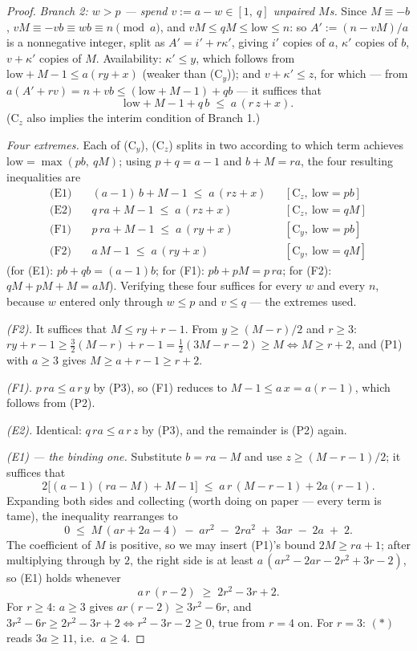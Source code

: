 \documentclass[11pt,reqno]{amsart}
\theoremstyle{plain}
\theoremstyle{definition}
\theoremstyle{remark}
\begin{document}
\begin{proof}
\emph{Branch 2: $w > p$ --- spend $v := a - w \in [1,\ q]$ unpaired $M$s.} Since
$M \equiv -b$, $vM \equiv -vb \equiv wb \equiv n \pmod a$, and $vM \le qM \le
\mathrm{low} \le n$: so $A' := (n - vM)/a$ is a nonnegative integer, split as $A'
= i' + r\kappa'$, giving $i'$ copies of $a$, $\kappa'$ copies of $b$, $v +
\kappa'$ copies of $M$. Availability: $\kappa' \le y$, which follows from
$\mathrm{low} + M - 1 \le a(ry + x)$ (weaker than (C$_y$)); and $v + \kappa' \le
z$, for which --- from $a(A' + rv) = n + vb \le (\mathrm{low} + M - 1) + qb$ ---
it suffices that
\[
  \mathrm{low} + M - 1 + q\,b \;\le\; a\,(r\,z + x) . \tag{C$_z$}
\]
(C$_z$ also implies the interim condition of Branch 1.)

\emph{Four extremes.} Each of (C$_y$), (C$_z$) splits in two according to which
term achieves $\mathrm{low} = \max(pb,\ qM)$; using $p + q = a - 1$ and $b + M =
ra$, the four resulting inequalities are
\begin{align*}
  \text{(E1)}\quad & (a-1)\,b + M - 1 \;\le\; a\,(rz + x)
  && [\text{C}_z,\ \mathrm{low} = pb] \\
  \text{(E2)}\quad & q\,ra + M - 1 \;\le\; a\,(rz + x)
  && [\text{C}_z,\ \mathrm{low} = qM] \\
  \text{(F1)}\quad & p\,ra + M - 1 \;\le\; a\,(ry + x)
  && [\text{C}_y,\ \mathrm{low} = pb] \\
  \text{(F2)}\quad & a\,M - 1 \;\le\; a\,(ry + x)
  && [\text{C}_y,\ \mathrm{low} = qM]
\end{align*}
(for (E1): $pb + qb = (a-1)b$; for (F1): $pb + pM = p\,ra$; for (F2): $qM + pM +
M = aM$). Verifying these four suffices for every $w$ and every $n$, because $w$
entered only through $w \le p$ and $v \le q$ --- the extremes used.

\emph{(F2).} It suffices that $M \le ry + r - 1$. From $y \ge (M - r)/2$ and $r
\ge 3$: $ry + r - 1 \ge \tfrac32(M - r) + r - 1 = \tfrac12(3M - r - 2) \ge M
\iff M \ge r + 2$, and (P1) with $a \ge 3$ gives $M \ge a + r - 1 \ge r + 2$.

\emph{(F1).} $p\,ra \le a\,r\,y$ by (P3), so (F1) reduces to $M - 1 \le a\,x =
a(r-1)$, which follows from (P2).

\emph{(E2).} Identical: $q\,ra \le a\,r\,z$ by (P3), and the remainder is (P2)
again.

\emph{(E1) --- the binding one.} Substitute $b = ra - M$ and use $z \ge (M - r -
1)/2$; it suffices that
\[
  2\big[ (a-1)(ra - M) + M - 1 \big] \;\le\; a\,r\,(M - r - 1) + 2a(r-1) .
\]
Expanding both sides and collecting (worth doing on paper --- every term is
tame), the inequality rearranges to
\[
  0 \;\le\; M\,(ar + 2a - 4) \;-\; ar^2 \;-\; 2ra^2 \;+\; 3ar \;-\; 2a \;+\; 2 .
\]
The coefficient of $M$ is positive, so we may insert (P1)'s bound $2M \ge ra + 1$;
after multiplying through by $2$, the right side is at least
$a\,( a r^2 - 2ar - 2r^2 + 3r - 2 )$, so (E1) holds whenever
\[
  a\,r\,(r - 2) \;\ge\; 2r^2 - 3r + 2 . \tag{$\ast$}
\]
For $r \ge 4$: $a \ge 3$ gives $ar(r-2) \ge 3r^2 - 6r$, and $3r^2 - 6r \ge 2r^2 -
3r + 2 \iff r^2 - 3r - 2 \ge 0$, true from $r = 4$ on. For $r = 3$: $(\ast)$
reads $3a \ge 11$, i.e.\ $a \ge 4$.


\end{proof}
\end{document}
